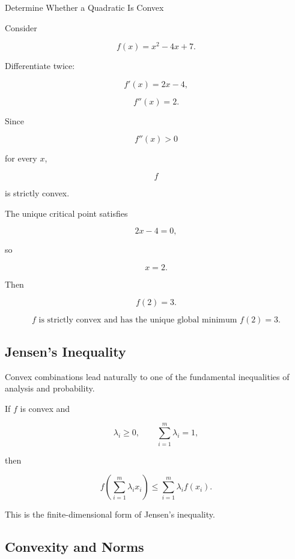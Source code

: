 \begin{workedexamplebox}{Determine Whether a Quadratic Is Convex}

Consider

\[
f(x)=x^2-4x+7.
\]

Differentiate twice:

\[
f'(x)=2x-4,
\]

\[
f''(x)=2.
\]

Since

\[
f''(x)>0
\]

for every \(x\),

\[
f
\]

is strictly convex.

The unique critical point satisfies

\[
2x-4=0,
\]

so

\[
x=2.
\]

Then

\[
f(2)=3.
\]

\begin{answerbox}
\[
\boxed{
f\text{ is strictly convex and has the unique global minimum }
f(2)=3.
}
\]
\end{answerbox}
\end{workedexamplebox}

\subsection{Jensen's Inequality}
\label{subsec:jensen-convex-geometry}

Convex combinations lead naturally to one of the fundamental inequalities
of analysis and probability.

\begin{theorem}
If \(f\) is convex and

\[
\lambda_i\geq0,
\qquad
\sum_{i=1}^{m}\lambda_i=1,
\]

then

\[
\boxed{
f\left(
\sum_{i=1}^{m}\lambda_ix_i
\right)
\leq
\sum_{i=1}^{m}\lambda_if(x_i).
}
\]
\end{theorem}

This is the finite-dimensional form of Jensen's inequality.

\subsection{Convexity and Norms}
\label{subsec:convexity-norms}

